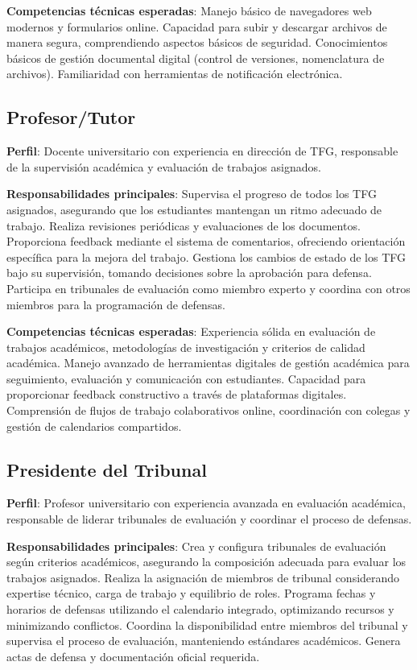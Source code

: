 \documentclass[12pt,a4paper,oneside]{report}
\begin{document}
\textbf{Competencias técnicas esperadas}: Manejo básico de navegadores web modernos y formularios online. Capacidad para subir y descargar archivos de manera segura, comprendiendo aspectos básicos de seguridad. Conocimientos básicos de gestión documental digital (control de versiones, nomenclatura de archivos). Familiaridad con herramientas de notificación electrónica.

\subsection{Profesor/Tutor}\label{profesortutor}

\textbf{Perfil}: Docente universitario con experiencia en dirección de
TFG, responsable de la supervisión académica y evaluación de trabajos
asignados.

\textbf{Responsabilidades principales}: Supervisa el progreso de todos los TFG asignados, asegurando que los estudiantes mantengan un ritmo adecuado de trabajo. Realiza revisiones periódicas y evaluaciones de los documentos. Proporciona feedback mediante el sistema de comentarios, ofreciendo orientación específica para la mejora del trabajo. Gestiona los cambios de estado de los TFG bajo su supervisión, tomando decisiones sobre la aprobación para defensa. Participa en tribunales de evaluación como miembro experto y coordina con otros miembros para la programación de defensas.

\textbf{Competencias técnicas esperadas}: Experiencia sólida en evaluación de trabajos académicos, metodologías de investigación y criterios de calidad académica. Manejo avanzado de herramientas digitales de gestión académica para seguimiento, evaluación y comunicación con estudiantes. Capacidad para proporcionar feedback constructivo a través de plataformas digitales. Comprensión de flujos de trabajo colaborativos online, coordinación con colegas y gestión de calendarios compartidos.

\subsection{Presidente del Tribunal}\label{presidente-del-tribunal}

\textbf{Perfil}: Profesor universitario con experiencia avanzada en
evaluación académica, responsable de liderar tribunales de evaluación y
coordinar el proceso de defensas.

\textbf{Responsabilidades principales}: Crea y configura tribunales de evaluación según criterios académicos, asegurando la composición adecuada para evaluar los trabajos asignados. Realiza la asignación de miembros de tribunal considerando expertise técnico, carga de trabajo y equilibrio de roles. Programa fechas y horarios de defensas utilizando el calendario integrado, optimizando recursos y minimizando conflictos. Coordina la disponibilidad entre miembros del tribunal y supervisa el proceso de evaluación, manteniendo estándares académicos. Genera actas de defensa y documentación oficial requerida.
\end{document}
